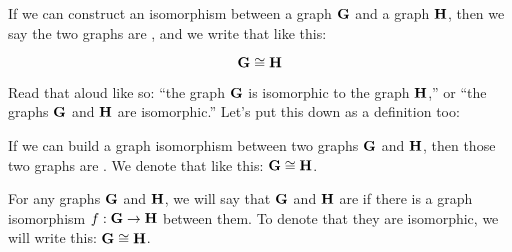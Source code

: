 \documentclass[../../../main.tex]{subfiles}
\begin{document}
If we can construct an isomorphism between a graph $\mathbf{G}$ and a graph $\mathbf{H}$, then we say the two graphs are , and we write that like this:

\begin{equation*}
  \graph{G} \isomorphic/ \graph{H}
\end{equation*} 

Read that aloud like so: ``the graph $\mathbf{G}$ is isomorphic to the graph $\mathbf{H}$,'' or ``the graphs $\mathbf{G}$ and $\mathbf{H}$ are isomorphic.'' Let's put this down as a definition too:

\begin{terminology}
  If we can build a graph isomorphism between two graphs $\mathbf{G}$ and $\mathbf{H}$, then those two graphs are . We denote that like this: $\graph{G} \isomorphic/ \graph{H}$.
\end{terminology}

\begin{fdefinition}
  \label{def:isomorphic-graphs}
  For any graphs $\mathbf{G}$ and $\mathbf{H}$, we will say that $\mathbf{G}$ and $\mathbf{H}$ are  if there is a graph isomorphism $f: \mathbf{G} \rightarrow \mathbf{H}$ between them. To denote that they are isomorphic, we will write this: $\graph{G} \isomorphic/ \graph{H}$.
\end{fdefinition}
\end{document}
